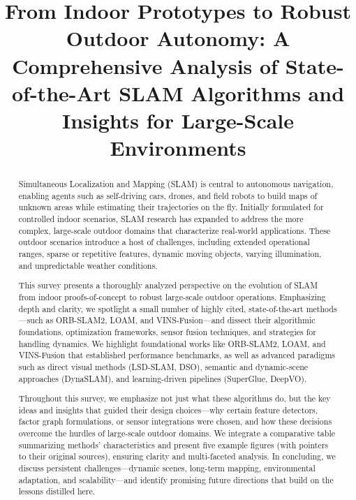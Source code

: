 \documentclass[conference]{IEEEtran}
\begin{document}
\title{From Indoor Prototypes to Robust Outdoor Autonomy: A Comprehensive Analysis of State-of-the-Art SLAM Algorithms and Insights for Large-Scale Environments}

\author{
}

\maketitle

\begin{abstract}
Simultaneous Localization and Mapping (SLAM) is central to autonomous navigation, enabling agents such as self-driving cars, drones, and field robots to build maps of unknown areas while estimating their trajectories on the fly. Initially formulated for controlled indoor scenarios, SLAM research has expanded to address the more complex, large-scale outdoor domains that characterize real-world applications. These outdoor scenarios introduce a host of challenges, including extended operational ranges, sparse or repetitive features, dynamic moving objects, varying illumination, and unpredictable weather conditions.

This survey presents a thoroughly analyzed perspective on the evolution of SLAM from indoor proofs-of-concept to robust large-scale outdoor operations. Emphasizing depth and clarity, we spotlight a small number of highly cited, state-of-the-art methods—such as ORB-SLAM2, LOAM, and VINS-Fusion—and dissect their algorithmic foundations, optimization frameworks, sensor fusion techniques, and strategies for handling dynamics. We highlight foundational works like ORB-SLAM2, LOAM, and VINS-Fusion that established performance benchmarks, as well as advanced paradigms such as direct visual methods (LSD-SLAM, DSO), semantic and dynamic-scene approaches (DynaSLAM), and learning-driven pipelines (SuperGlue, DeepVO).

Throughout this survey, we emphasize not just what these algorithms do, but the key ideas and insights that guided their design choices—why certain feature detectors, factor graph formulations, or sensor integrations were chosen, and how these decisions overcome the hurdles of large-scale outdoor domains. We integrate a comparative table summarizing methods’ characteristics and present five example figures (with pointers to their original sources), ensuring clarity and multi-faceted analysis. In concluding, we discuss persistent challenges—dynamic scenes, long-term mapping, environmental adaptation, and scalability—and identify promising future directions that build on the lessons distilled here.
\end{abstract}
\end{document}
